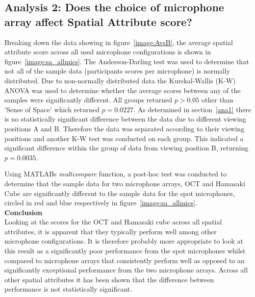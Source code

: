 















\subsection{Analysis 2: Does the choice of microphone array affect Spatial Attribute score?}
	\label{ana2}


		Breaking down the data showing in figure~\ref{image:AvsB}, the average spatial attribute score across all used microphone configurations is shown in figure~\ref{image:sa_allmics}. The Anderson-Darling test was used to determine that not all of the sample data (participants scores per microphone) is normally distributed. Due to non-normally distributed data the Kurskal-Wallis (K-W) ANOVA was used to determine whether the average scores between any of the samples were significantly different. All groups returned $p > 0.05 $ other than 'Sense of Space' which returned $p = 0.0227 $. As determined in section~\ref{ana1} there is no statistically significant difference between the data due to different viewing positions A and B. Therefore the data was separated according to their viewing positions and another K-W test was conducted on each group. This indicated a significant difference within the group of data from viewing position B, returning $ p = 0.0035 $.

		Using MATLABs \textit{multcompare} function, a post-hoc test was conducted to determine that the sample data for two microphone arrays, OCT and Hamasaki Cube are significantly different to the sample data for the spot microphones, circled in red and blue respectively in figure~\ref{image:sa_allmics}.\\

		\textbf{Conclusion} \\

		 Looking at the scores for the OCT and Hamasaki cube across all spatial attributes, it is apparent that they typically perform well among other microphone configurations. It is therefore probably more appropriate to look at this result as a significantly poor performance from the spot microphones whilst compared to microphone arrays that consistently perform well as opposed to an significantly exceptional performance from the two microphone arrays. Across all other spatial attributes it has been shown that the difference between performance is not statistically significant.

